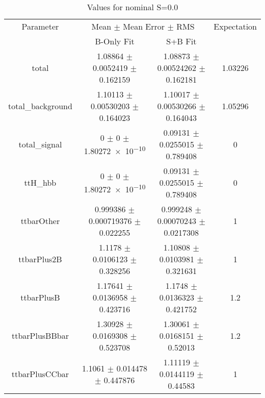 \begin{table}
\centering
\caption{Values for nominal S=0.0}
\begin{tabular}{cccc}
\toprule
Parameter & \multicolumn{2}{c}{Mean $\pm$ Mean Error $\pm$ RMS} & Expectation\\
 & B-Only Fit & S+B Fit & \\
\midrule
total & \num{1.08864} $\pm$ \num{0.0052419} $\pm$ \num{0.162159} & \num{1.08873} $\pm$ \num{0.00524262} $\pm$ \num{0.162181} & \num{1.03226}\\
total\_background & \num{1.10113} $\pm$ \num{0.00530203} $\pm$ \num{0.164023} & \num{1.10017} $\pm$ \num{0.00530266} $\pm$ \num{0.164043} & \num{1.05296}\\
total\_signal & \num{0} $\pm$ \num{0} $\pm$ \num{1.80272e-10} & \num{0.09131} $\pm$ \num{0.0255015} $\pm$ \num{0.789408} & \num{0}\\
ttH\_hbb & \num{0} $\pm$ \num{0} $\pm$ \num{1.80272e-10} & \num{0.09131} $\pm$ \num{0.0255015} $\pm$ \num{0.789408} & \num{0}\\
ttbarOther & \num{0.999386} $\pm$ \num{0.000719376} $\pm$ \num{0.022255} & \num{0.999248} $\pm$ \num{0.00070243} $\pm$ \num{0.0217308} & \num{1}\\
ttbarPlus2B & \num{1.1178} $\pm$ \num{0.0106123} $\pm$ \num{0.328256} & \num{1.10808} $\pm$ \num{0.0103981} $\pm$ \num{0.321631} & \num{1}\\
ttbarPlusB & \num{1.17641} $\pm$ \num{0.0136958} $\pm$ \num{0.423716} & \num{1.1748} $\pm$ \num{0.0136323} $\pm$ \num{0.421752} & \num{1.2}\\
ttbarPlusBBbar & \num{1.30928} $\pm$ \num{0.0169308} $\pm$ \num{0.523708} & \num{1.30061} $\pm$ \num{0.0168151} $\pm$ \num{0.52013} & \num{1.2}\\
ttbarPlusCCbar & \num{1.1061} $\pm$ \num{0.014478} $\pm$ \num{0.447876} & \num{1.11119} $\pm$ \num{0.0144119} $\pm$ \num{0.44583} & \num{1}\\
\bottomrule
\end{tabular}
\end{table}